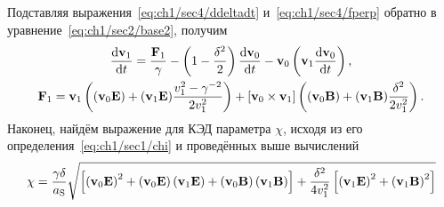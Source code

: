 Подставляя выражения~\eqref{eq:ch1/sec4/ddeltadt} и~\eqref{eq:ch1/sec4/fperp} обратно в уравнение~\eqref{eq:ch1/sec2/base2}, получим
\begin{gather}
    \label{eq:ch1/sec4/2nd_order_B}
    \dv{\vb{v}_1}{t} = \frac{\vb{F}_1}{\gamma} - \left( 1 - \frac{\delta^2}{2} \right)\dv{\vb{v}_0}{t} -\vb{v}_0\left(\vb{v}_1\dv{\vb{v}_0}{t} \right), \\
    \label{eq:ch1/sec4/f1_A}
    \vb{F}_1 = \vb{v}_1 \left( (\vb{v}_0 \vb{E}) + (\vb{v}_1 \vb{E})\frac{v_1^2 - \gamma^{-2} }{2v_1^2} \right)
    + [\vb{v}_0\times\vb{v}_1] \left( (\vb{v}_0 \vb{B}) + (\vb{v}_1 \vb{B}) \frac{\delta^2}{2v_1^2}\right) .
\end{gather}
Наконец, найдём выражение для КЭД параметра $\chi$, исходя из его определения~\eqref{eq:ch1/sec1/chi} и проведённых выше вычислений
\begin{equation}
    \chi = \frac{\gamma \delta}{a_\mathrm{S}}\sqrt{\left[ \left( \vb{v}_0 \vb{E} \right)^2 + \left( \vb{v}_0\vb{E} \right)\left( \vb{v}_1\vb{E} \right) + \left( \vb{v}_0\vb{B} \right)\left( \vb{v}_1\vb{B} \right) \right] + \frac{\delta^2}{4v_1^2}\left[ \left( \vb{v}_1 \vb{E} \right)^2 + \left( \vb{v}_1 \vb{B} \right)^2 \right]}
\end{equation}

